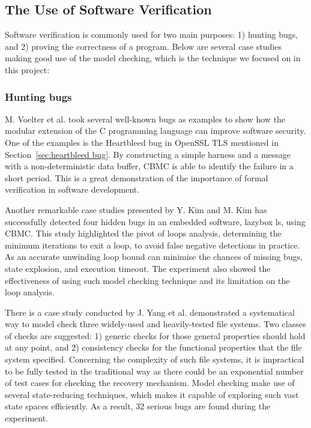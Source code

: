 \subsection{The Use of Software Verification}
Software verification is commonly used for two main purposes: 1) hunting bugs, and 2) proving the correctness of a program. Below are several case studies making good use of the model checking, which is the technique we focused on in this project:

\subsubsection{Hunting bugs}
M. Voelter et al.\cite{Voelter:2015:TIS:2846696.2846698} took several well-known bugs as examples to show how the modular extension of the C programming language can improve software security. One of the examples is the Heartbleed bug in OpenSSL TLS mentioned in Section~\ref{sec:heartbleed bug}. By constructing a simple harness and a message with a non-deterministic data buffer, CBMC is able to identify the failure in a short period. This is a great demonstration of the importance of formal verification in software development. 

Another remarkable case studies presented by Y. Kim and M. Kim \cite{7091291} has successfully detected four hidden bugs in an embedded software, lazybox ls, using CBMC. This study highlighted the pivot of loops analysis, determining the minimum iterations to exit a loop, to avoid false negative detections in practice. As an accurate unwinding loop bound can minimise the chances of missing bugs, state explosion, and execution timeout. The experiment also showed the effectiveness of using such model checking technique and its limitation on the loop analysis. 

There is a case study conducted by J. Yang et al. \cite{Yang:2006:UMC:1189256.1189259} demonstrated a systematical way to model check three widely-used and heavily-tested file systems. Two classes of checks are suggested: 1) generic checks for those general properties should hold at any point, and 2) consistency checks for the functional properties that the file system specified. Concerning the complexity of such file systems, it is impractical to be fully tested in the traditional way as there could be an exponential number of test cases for checking the recovery mechanism. Model checking make use of several state-reducing techniques, which makes it capable of exploring such vast state spaces efficiently. As a result, 32 serious bugs are found during the experiment.

